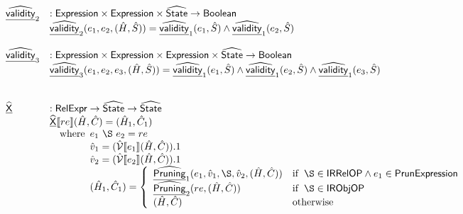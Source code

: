 \[\begin{array}{ll}
\ahf{validity}_2 & : \sf{Expression} \times \sf{Expression} \times \aState \rightarrow {\sf Boolean}\\
& \ahf{validity}_2(e_1, e_2, (\hat{H}, \hat{S})) = \ahf{validity}_1(e_1, \hat{S}) \land \ahf{validity}_1(e_2, \hat{S})\\\\

\ahf{validity}_3 & : \sf{Expression} \times \sf{Expression} \times \sf{Expression} \times \aState \rightarrow {\sf Boolean}\\
& \ahf{validity}_3(e_1, e_2, e_3, (\hat{H}, \hat{S})) = \ahf{validity}_1(e_1, \hat{S}) \land \ahf{validity}_1(e_2, \hat{S}) \land \ahf{validity}_1(e_3, \hat{S})\\
\\\\


\ahf{X} & : \SF{RelExpr} \rightarrow \aState \rightarrow \aState\\
& \ahf{X} \lbr re \rbr (\hat{H}, \hat{C}) = (\hat{H}_1, \hat{C}_1)\\
& \quad\wherec{
  e_1 ~ \rel ~ e_2 = re\\
  \hat{v}_1 = (\aV \lbr e_1 \rbr (\hat{H}, \hat{C})).1\\
  \hat{v}_2 = (\aV \lbr e_2 \rbr (\hat{H}, \hat{C})).1\\
  (\hat{H}_1, \hat{C}_1) = 
    \left\{ 
      \begin{array}{ll}
        \ahf {Pruning}_1 (e_1, \hat{v}_1, \rel, \hat{v}_2, (\hat{H}, \hat{C})) & 
          \ifc{\rel \in \SF{IRRelOP} \land e_1 \in \SF{PrunExpression}}\\
        \ahf {Pruning}_2 ( re, (\hat{H}, \hat{C})) & 
          \ifc{\rel \in \SF{IRObjOP}}\\
        (\hat{H}, \hat{C}) & \owc\\
      \end{array}
    \right.\\
}\\


\end{array}
\]
\\




